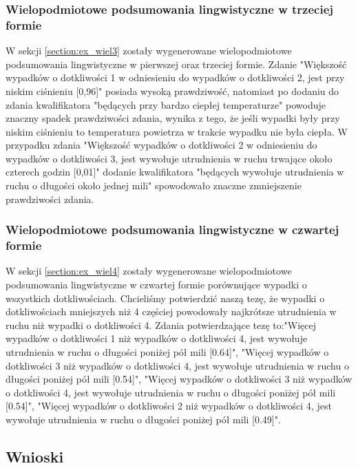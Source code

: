 \documentclass{classrep}
\begin{document}
\subsubsection{Wielopodmiotowe podsumowania lingwistyczne w trzeciej formie}

W sekcji \ref{section:ex_wiel3} zostały wygenerowane wielopodmiotowe podsumowania lingwistyczne w pierwszej oraz trzeciej formie. Zdanie "Większość wypadków o dotkliwości 1 w odniesieniu do wypadków o dotkliwości 2, jest przy niskim ciśnieniu [0,96]" posiada wysoką prawdziwość, natomiast po dodaniu do zdania kwalifikatora "będących przy bardzo ciepłej temperaturze" powoduje znaczny spadek prawdziwości zdania, wynika z tego, że jeśli wypadki były przy niskim ciśnieniu to temperatura powietrza w trakcie wypadku nie była ciepła. W przypadku zdania "Większość wypadków o dotkliwości 2 w odniesieniu do wypadków o dotkliwości 3, jest wywołuje utrudnienia w ruchu trwające około czterech godzin [0,01]" dodanie kwalifikatora "będących wywołuje utrudnienia w ruchu o długości około jednej mili" spowodowało znaczne zmniejszenie prawdziwości zdania. \\

\subsubsection{Wielopodmiotowe podsumowania lingwistyczne w czwartej formie}

W sekcji \ref{section:ex_wiel4} zostały wygenerowane wielopodmiotowe podsumowania lingwistyczne w czwartej formie porównujące wypadki o wszystkich dotkliwościach. Chcieliśmy potwierdzić naszą tezę, że wypadki o dotkliwościach mniejszych niż 4 częściej powodowały najkrótsze utrudnienia w ruchu niż wypadki o dotkliwości 4. Zdania potwierdzające tezę to:"Więcej wypadków o dotkliwości 1 niż wypadków o dotkliwości 4, jest wywołuje utrudnienia w ruchu o długości poniżej pół mili [0.64]", "Więcej wypadków o dotkliwości 3 niż wypadków o dotkliwości 4, jest wywołuje utrudnienia w ruchu o długości poniżej pół mili [0.54]", "Więcej wypadków o dotkliwości 3 niż wypadków o dotkliwości 4, jest wywołuje utrudnienia w ruchu o długości poniżej pół mili [0.54]", "Więcej wypadków o dotkliwości 2 niż wypadków o dotkliwości 4, jest wywołuje utrudnienia w ruchu o długości poniżej pół mili [0.49]". \\


\subsection{Wnioski}
\end{document}
